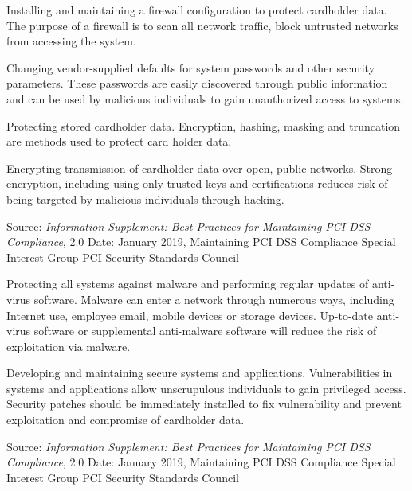 \documentclass[Screen16to9,17pt]{foils}
\begin{document}

\begin{list1}
\item Installing and maintaining a firewall configuration to protect cardholder data. The purpose of a firewall is to scan all network traffic, block untrusted networks from accessing the system.
\item Changing vendor-supplied defaults for system passwords and other security parameters. These passwords are easily discovered through public information and can be used by malicious individuals to gain unauthorized access to systems.
\item Protecting stored cardholder data. Encryption, hashing, masking and truncation are methods used to protect card holder data.
\item Encrypting transmission of cardholder data over open, public networks. Strong encryption, including using only trusted keys and certifications reduces risk of being targeted by malicious individuals through hacking.
\end{list1}
Source:
\emph{Information Supplement:
Best Practices for Maintaining
PCI DSS Compliance}, 2.0
Date: January 2019, Maintaining PCI DSS Compliance Special Interest Group
PCI Security Standards Council


\begin{list1}
\item Protecting all systems against malware and performing regular updates of anti-virus software. Malware can enter a network through numerous ways, including Internet use, employee email, mobile devices or storage devices. Up-to-date anti-virus software or supplemental anti-malware software will reduce the risk of exploitation via malware.
\item Developing and maintaining secure systems and applications. Vulnerabilities in systems and applications allow unscrupulous individuals to gain privileged access. Security patches should be immediately installed to fix vulnerability and prevent exploitation and compromise of cardholder data.
\end{list1}
Source:
\emph{Information Supplement:
Best Practices for Maintaining
PCI DSS Compliance}, 2.0
Date: January 2019, Maintaining PCI DSS Compliance Special Interest Group
PCI Security Standards Council

\end{document}
